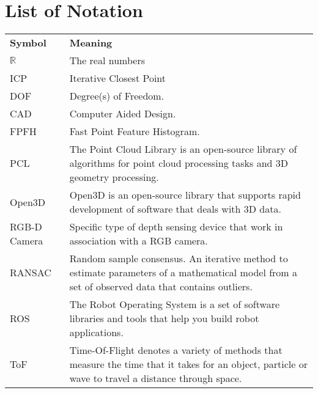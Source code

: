 
\appendix
\chapter*{List of Notation}
\begin{tabularx}{\linewidth}
{ l >{\raggedright\arraybackslash}X }
\bfseries Symbol & \bfseries Meaning \\\Midrule
$\mathbb{R}$ & The real numbers \\
ICP & Iterative Closest Point\\
DOF & Degree(s) of Freedom.\\
CAD & Computer Aided Design.\\
FPFH & Fast Point Feature Histogram.\\
PCL & The Point Cloud Library is an open-source library of algorithms for point cloud processing tasks and 3D geometry processing. \\
Open3D & Open3D is an open-source library that supports rapid development of software that deals with 3D data.\\
RGB-D Camera & Specific type of depth sensing device that work in association with a RGB camera.\\
RANSAC & Random sample consensus. An iterative method to estimate parameters of a mathematical model from a set of observed data that contains outliers.\\
ROS & The Robot Operating System is a set of software libraries and tools that help you build robot applications.\\
ToF & Time-Of-Flight denotes a variety of methods that measure the time that it takes for an object,
particle or wave to travel a distance through space.

\end{tabularx}